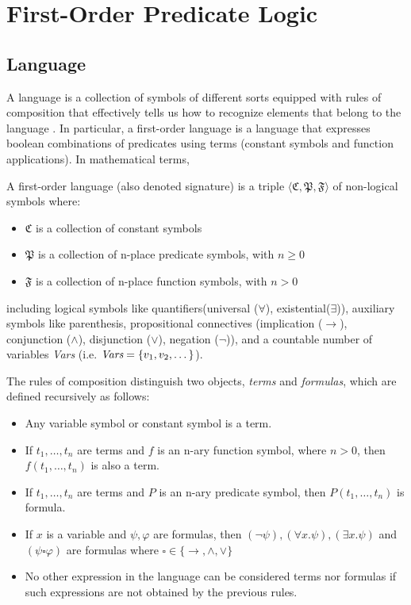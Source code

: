 \section{First-Order Predicate Logic}

\subsection{Language}
A language is a collection of symbols of different sorts equipped with rules of 
composition that effectively tells us how to recognize elements that belong 
to the language \cite{DBLP:books/daglib/0080654}. In particular, a first-order 
language is a language that expresses boolean combinations of predicates 
using terms (constant symbols and function applications). In mathematical terms, 

\begin{definition}
 A first-order language (also denoted signature) is a triple $\langle \mathfrak{C}, \mathfrak{P}, \mathfrak{F} \rangle$ of non-logical symbols where:

\begin{itemize}
  \item $\mathfrak{C}$ is a collection of constant symbols
  \item $\mathfrak{P}$ is a collection of n-place predicate symbols, with $n \geq 0$
  \item $\mathfrak{F}$ is a collection of n-place function symbols, with $n > 0$
\end{itemize}

including logical symbols like quantifiers(universal ($\forall$), existential($\exists$)), auxiliary symbols like parenthesis, propositional connectives (implication ($\rightarrow$), conjunction ($\land$), disjunction ($\lor$), negation ($\neg$)), and a countable number of variables \emph{Vars} (i.e. $\emph{Vars} = \{v_1, v_2, \dots\}$).

The rules of composition distinguish two objects, \emph{terms} and \emph{formulas}, which are defined recursively as follows:

\begin{itemize}
  \item Any variable symbol or constant symbol is a term.
  \item If $t_1, \dots, t_n$ are terms and $f$ is an n-ary function symbol, where $n > 0$, then $f(t_1, \dots, t_n)$ is also a term.
  \item If $t_1, \dots, t_n$ are terms and $P$ is an n-ary predicate symbol, then $P(t_1, \dots, t_n)$ is formula.
  \item If $x$ is a variable and $\psi, \varphi$ are formulas, 
    then $(\neg \psi), (\forall x . \psi), (\exists x . \psi)$ 
    and $(\psi \square \varphi)$ are formulas where $\square \in \{\rightarrow, \land, \lor\}$
  \item No other expression in the language can be considered terms nor formulas if such expressions are not obtained by the previous rules.
\end{itemize}


\end{definition}
